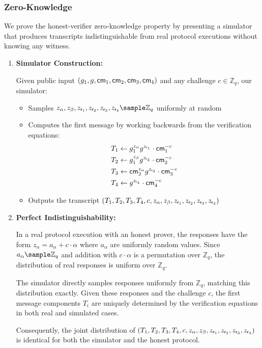\subsubsection*{Zero-Knowledge}
We prove the honest-verifier zero-knowledge property by presenting a simulator that produces transcripts indistinguishable from real protocol executions without knowing any witness.

\begin{enumerate}
    \item \textbf{Simulator Construction:}
    
    Given public input $(g_1, g, \mathsf{cm}_1, \mathsf{cm}_2, \mathsf{cm}_3, \mathsf{cm}_4)$ and any challenge $c \in \mathbb{Z}_q$, our simulator:
    
    \begin{itemize}
        \item Samples $z_\alpha, z_\beta, z_{\usk_1}, z_{\usk_2}, z_{\usk_3}, z_{\usk_4} \sample \mathbb{Z}_q$ uniformly at random
        
        \item Computes the first message by working backwards from the verification equations:
        \begin{align}
            T_1 &\gets g_1^{z_\alpha} g^{z_{\mathsf{r}_1}} \cdot \mathsf{cm}_1^{-c} \\
            T_2 &\gets g_1^{z_\beta} g^{z_{\mathsf{r}_2}} \cdot \mathsf{cm}_2^{-c} \\
            T_3 &\gets \mathsf{cm}_2^{z_\alpha} g^{z_{\mathsf{r}_3}} \cdot \mathsf{cm}_3^{-c} \\
            T_4 &\gets g^{z_{\mathsf{r}_4}} \cdot \mathsf{cm}_4^{-c}
        \end{align}
        
        \item Outputs the transcript $(T_1, T_2, T_3, T_4, c, z_\alpha, z_\beta, z_{\mathsf{r}_1}, z_{\mathsf{r}_2}, z_{\mathsf{r}_3}, z_{\mathsf{r}_4})$
    \end{itemize}
    
    \item \textbf{Perfect Indistinguishability:}
    
    In a real protocol execution with an honest prover, the responses have the form $z_\alpha = a_\alpha + c \cdot \alpha$ where $a_\alpha$ are uniformly random values. Since $a_\alpha \sample \mathbb{Z}_q$ and addition with $c \cdot \alpha$ is a permutation over $\mathbb{Z}_q$, the distribution of real responses is uniform over $\mathbb{Z}_q$.
    
    The simulator directly samples responses uniformly from $\mathbb{Z}_q$, matching this distribution exactly. Given these responses and the challenge $c$, the first message components $T_i$ are uniquely determined by the verification equations in both real and simulated cases.
    
    Consequently, the joint distribution of $(T_1, T_2, T_3, T_4, c, z_\alpha, z_\beta, z_{\mathsf{r}_1}, z_{\mathsf{r}_2}, z_{\mathsf{r}_3}, z_{\mathsf{r}_4})$ is identical for both the simulator and the honest protocol.
\end{enumerate}

